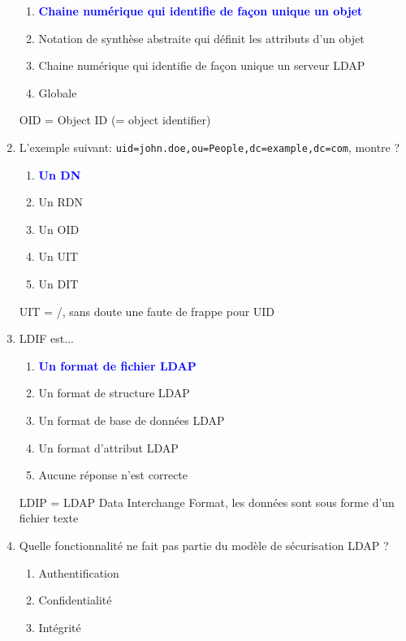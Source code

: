\documentclass[a4paper]{article}
\begin{document}
\begin{enumerate}
\begin{enumerate}
        \item \textcolor{blue}{\textbf{Chaine numérique qui identifie de façon unique un objet}}
        \item Notation de synthèse abstraite qui définit les attributs d'un objet
        \item Chaine numérique qui identifie de façon unique un serveur LDAP
        \item Globale
    \end{enumerate}
    \begin{example} OID = Object ID (= object identifier) \end{example}
    \item L'exemple suivant: \texttt{uid=john.doe,ou=People,dc=example,dc=com}, montre ?
    \begin{enumerate}
        \item \textcolor{blue}{\textbf{Un DN}}
        \item Un RDN
        \item Un OID
        \item Un UIT
        \item Un DIT
    \end{enumerate}
    \begin{example} UIT = /, sans doute une faute de frappe pour UID \end{example}
    \item LDIF est...
    \begin{enumerate}
        \item \textcolor{blue}{\textbf{Un format de fichier LDAP}}
        \item Un format de structure LDAP
        \item Un format de base de données LDAP
        \item Un format d'attribut LDAP
        \item Aucune réponse n'est correcte
    \end{enumerate}
    \begin{example} LDIP = LDAP Data Interchange Format, les données sont sous forme d'un fichier texte \end{example}
    \item Quelle fonctionnalité ne fait pas partie du modèle de sécurisation LDAP ?
    \begin{enumerate}
        \item Authentification
        \item Confidentialité
        \item Intégrité

\end{enumerate}
\end{enumerate}
\end{document}
